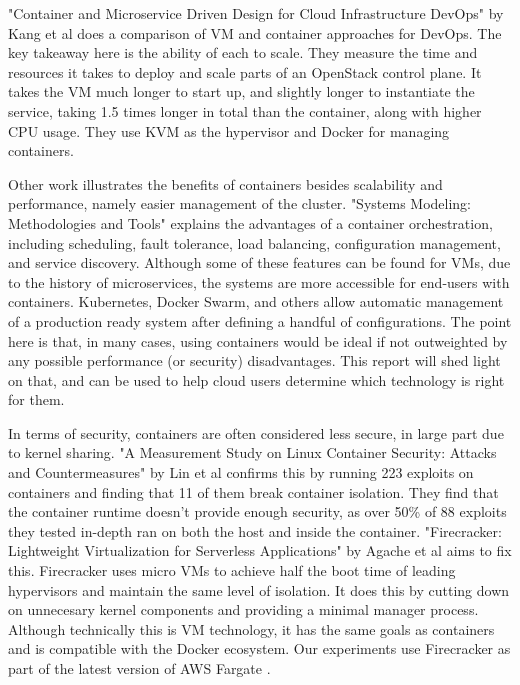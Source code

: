 \documentclass[11pt]{article}
\begin{document}
"Container and Microservice Driven Design for Cloud Infrastructure DevOps" by Kang et al \cite{7484185} does a comparison of VM and container approaches for DevOps. The key takeaway here is the ability of each to scale. They measure the time and resources it takes to deploy and scale parts of an OpenStack control plane. It takes the VM much longer to start up, and slightly longer to instantiate the service, taking 1.5 times longer in total than the container, along with higher CPU usage. They use KVM as the hypervisor and Docker for managing containers.

Other work illustrates the benefits of containers besides scalability and performance, namely easier management of the cluster. "Systems Modeling: Methodologies and Tools" \cite{Casalicchio2019} explains the advantages of a container orchestration, including scheduling, fault tolerance, load balancing, configuration management, and service discovery. Although some of these features can be found for VMs, due to the history of microservices, the systems are more accessible for end-users with containers. Kubernetes, Docker Swarm, and others allow automatic management of a production ready system after defining a handful of configurations. The point here is that, in many cases, using containers would be ideal if not outweighted by any possible performance (or security) disadvantages. This report will shed light on that, and can be used to help cloud users determine which technology is right for them.

In terms of security, containers are often considered less secure, in large part due to kernel sharing. "A Measurement Study on Linux Container Security: Attacks and Countermeasures" by Lin et al \cite{10.1145/3274694.3274720} confirms this by running 223 exploits on containers and finding that 11 of them break container isolation. They find that the container runtime doesn't provide enough security, as over 50\% of 88 exploits they tested in-depth ran on both the host and inside the container. "Firecracker: Lightweight Virtualization for Serverless Applications" by Agache et al \cite{246288} aims to fix this. Firecracker uses micro VMs to achieve half the boot time of leading hypervisors and maintain the same level of isolation. It does this by cutting down on unnecesary kernel components and providing a minimal manager process. Although technically this is VM technology, it has the same goals as containers and is compatible with the Docker ecosystem. Our experiments use Firecracker as part of the latest version of AWS Fargate \cite{fargate}.
\end{document}

